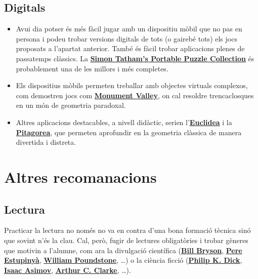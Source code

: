 \documentclass[a4paper, 12pt]{article}
\begin{document}
        \subsection*{Digitals}

            \begin{itemize}
                \item Avui dia potser és més fàcil jugar amb un dispositiu mòbil que no pas en persona i podeu trobar versions digitals de tots (o gairebé tots) els jocs proposats a l'apartat anterior. També és fàcil trobar aplicacions plenes de passatemps clàssics. La \href{https://play.google.com/store/apps/details?id=name.boyle.chris.sgtpuzzles}{\textbf{Simon Tatham's Portable Puzzle Collection}} és probablement una de les millors i més completes.
                \item Els dispositius mòbils permeten treballar amb objectes virtuals complexos, com demostren jocs com \href{https://play.google.com/store/apps/details?id=com.ustwo.monumentvalley}{\textbf{Monument Valley}}, on cal resoldre trencaclosques en un món de geometria paradoxal.
                \item Altres aplicacions destacables, a nivell didàctic, serien l'\href{https://play.google.com/store/apps/details?id=com.hil_hk.euclidea}{\textbf{Euclidea}} i la \href{https://play.google.com/store/apps/details?id=com.hil_hk.pythagorea}{\textbf{Pitagorea}}, que permeten aprofundir en la geometria clàssica de manera divertida i distreta.
            \end{itemize}

    \newpage %
    
    \section*{Altres recomanacions}

        \subsection*{Lectura}

            Practicar la lectura no només no va en contra d'una bona formació tècnica sinó que sovint n'és la clau. Cal, però, fugir de lectures obligatòries i trobar gèneres que motivin a l'alumne, com ara la divulgació científica (\href{https://ca.wikipedia.org/wiki/Bill_Bryson}{\textbf{Bill Bryson}}, \href{https://ca.wikipedia.org/wiki/Pere_Estupiny\%C3\%A0}{\textbf{Pere Estupinyà}}, \href{https://en.wikipedia.org/wiki/William_Poundstone}{\textbf{William Poundstone}}, \dots) o la ciència ficció (\href{https://ca.wikipedia.org/wiki/Philip_K._Dick}{\textbf{Philip K. Dick}}, \href{https://ca.wikipedia.org/wiki/Isaac_Asimov}{\textbf{Isaac Asimov}}, \href{https://ca.wikipedia.org/wiki/Arthur_C._Clarke}{\textbf{Arthur C. Clarke}}, \dots).
\end{document}
